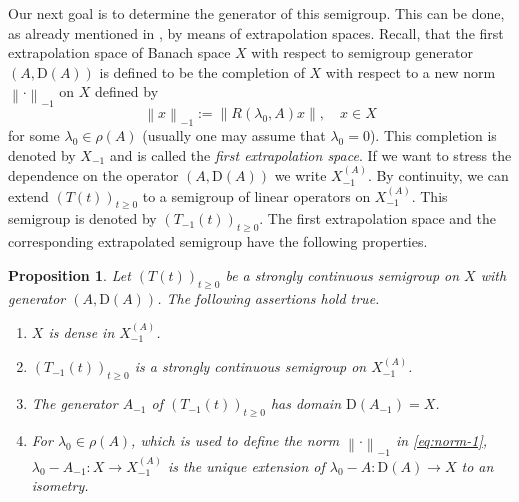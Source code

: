 \documentclass[a4paper,oneside,10pt]{amsart}
\newtheorem{proposition}[theorem]{Proposition}
\theoremstyle{definition}
\numberwithin{equation}{section}
\newenvironment{iiv}{\begin{enumerate}[{\rm (i)}]}{\end{enumerate}}
\def\dom{\mathrm{D}}
\begin{document}
\medskip
Our next goal is to determine the generator of this semigroup. This can be done, as already mentioned in \cite[Sect.~4]{NNR1996}, by means of extrapolation spaces. Recall, that the first extrapolation space of  Banach space $X$ with respect to  semigroup generator $(A,\dom(A))$ is defined to be the completion of $X$ with respect to a new norm $\left\|\cdot\right\|_{-1}$ on $X$ defined by
\begin{equation}\label{eq:norm-1}
\left\|x\right\|_{-1}:=\left\| {R({\lambda_0}, A)} x\right\|,\quad x\in X
\end{equation}
{for some ${\lambda_0}\in\rho(A)$ (usually one may assume that ${\lambda_0} =0$)}. This completion is denoted by $X_{-1}$ and is called the \emph{first extrapolation space}. If we want to stress the dependence on the operator $(A,\dom(A))$ we write $X_{-1}^{(A)}$. By continuity, we can extend $(T(t))_{t\geq0}$ to a semigroup of linear operators on {$X_{-1}^{(A)}$}. This semigroup is denoted by $(T_{-1}(t))_{t\geq0}$. The first extrapolation space and the corresponding extrapolated semigroup have the following properties.

\begin{proposition}{\cite[Thm.~II.5.5]{EN}}\label{prop:extra}
Let $(T(t))_{t\geq0}$ be a strongly continuous semigroup on $X$ with generator $(A,\dom(A))$. The following assertions hold true.
\begin{iiv}
	\item $X$ is dense in $X_{-1}^{(A)}$.
	\item $(T_{-1}(t))_{t\geq0}$ is a strongly continuous semigroup on $X_{-1}^{(A)}$.
	\item The generator $A_{-1}$ of $(T_{-1}(t))_{t\geq0}$ has domain $\dom(A_{-1})=X$. 
	\item {For $\lambda_0\in\rho(A)$, which is used to define the norm $\left\|\cdot\right\|_{-1}$ in \eqref{eq:norm-1},  $\lambda_0-A_{-1}\colon X\rightarrow X_{-1}^{(A)}$ is the unique extension of $\lambda_0-A\colon\dom(A)\rightarrow X$ to an isometry.}
\end{iiv}
\end{proposition}
\end{document}
